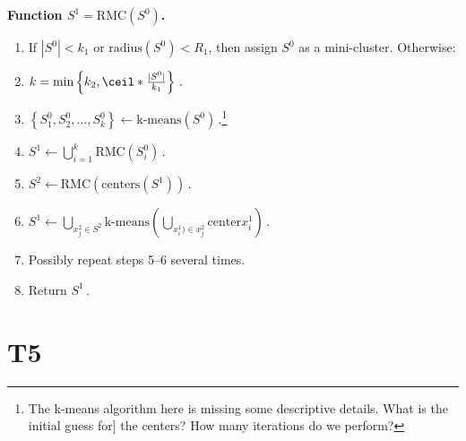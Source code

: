 \documentclass{article} %
\begin{document}
{\bf Function $S^1 = \text{RMC}(S^0)$.}
\begin{enumerate}
    \item If $|S^0| < k_1$ or $\text{radius}(S^0) < R_1$, then assign $S^0$ as  a mini-cluster. Otherwise:
    \item $k = \min\left\{k_2, \ceil*{\frac{|S^0|}{k_1}} \right\}\,.$
    \item $\left\{S^0_1,S^0_2,\dots,S^0_k\right\} \longleftarrow \text{k-means}\left(S^0\right)\,.$\footnote{The k-means algorithm here is missing some descriptive details. What is the initial guess for] the centers? How many iterations do we perform?}
    \item $S^1 \longleftarrow \bigcup_{i=1}^k \text{RMC}\left(S^0_i\right)\,.$
    \item $S^2 \longleftarrow \text{RMC}\left(\text{centers}\left(S^1\right)\right)\,.$
    \item $S^1 \longleftarrow \bigcup_{x_j^2 \in S^2} \text{k-means}\left(\bigcup_{x_i^1) \in x^2_j} \text{center}x_i^1 \right)\,.$
    \item Possibly repeat steps 5--6 several times.
    \item Return $S^1$\,.
\end{enumerate}

\section{T5}
\end{document}
